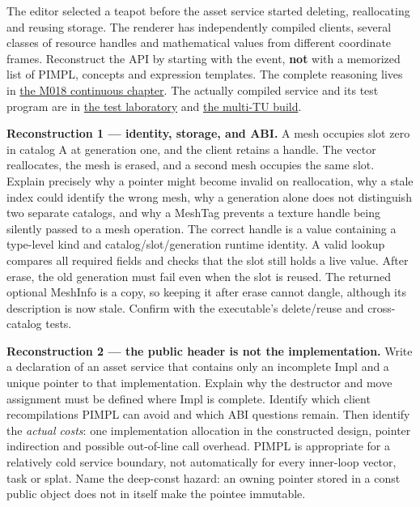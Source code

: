 The editor selected a teapot before the asset service started deleting, reallocating and reusing storage. The renderer has independently compiled clients, several classes of resource handles and mathematical values from different coordinate frames. Reconstruct the API by starting with the event, \textbf{not} with a memorized list of PIMPL, concepts and expression templates. The complete reasoning lives in \href{Continuous\%20Notes/Computing\%20Foundations\%20-\%20From\%20Bits\%20to\%20C++\%20and\%20Systems\%20APIs\#A\%20registry\%20crosses\%20its\%20last\%20C++\%20boundary:\%20hidden\%20implementation,\%20typed\%20identity\%20and\%20measured\%20abstraction\%20cost}{the M018 continuous chapter}. The actually compiled service and its test program are in \href{tools/m018/m018_lab.cpp}{the test laboratory} and \href{tools/m018/build_m018_lab.sh}{the multi-TU build}.

\textbf{Reconstruction 1 --- identity, storage, and ABI.} A mesh occupies slot zero in catalog A at generation one, and the client retains a handle. The vector reallocates, the mesh is erased, and a second mesh occupies the same slot. Explain precisely why a pointer might become invalid on reallocation, why a stale index could identify the wrong mesh, why a generation alone does not distinguish two separate catalogs, and why a MeshTag prevents a texture handle being silently passed to a mesh operation. The correct handle is a value containing a type-level kind and catalog/slot/generation runtime identity. A valid lookup compares all required fields and checks that the slot still holds a live value. After erase, the old generation must fail even when the slot is reused. The returned optional MeshInfo is a copy, so keeping it after erase cannot dangle, although its description is now stale. Confirm with the executable's delete/reuse and cross-catalog tests.

\textbf{Reconstruction 2 --- the public header is not the implementation.} Write a declaration of an asset service that contains only an incomplete Impl and a unique pointer to that implementation. Explain why the destructor and move assignment must be defined where Impl is complete. Identify which client recompilations PIMPL can avoid and which ABI questions remain. Then identify the \emph{actual costs}: one implementation allocation in the constructed design, pointer indirection and possible out-of-line call overhead. PIMPL is appropriate for a relatively cold service boundary, not automatically for every inner-loop vector, task or splat. Name the deep-const hazard: an owning pointer stored in a const public object does not in itself make the pointee immutable.

